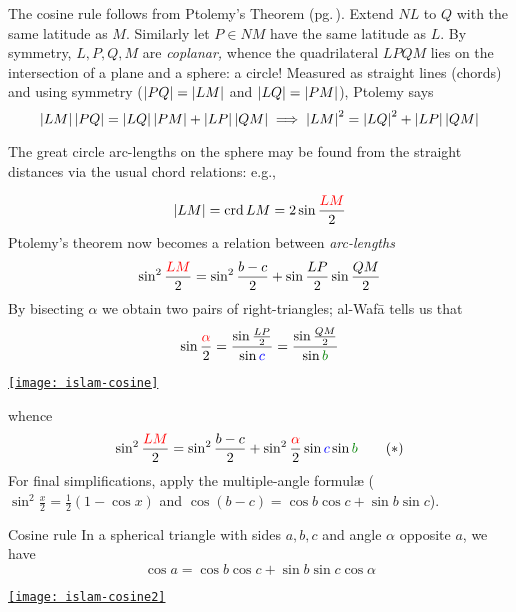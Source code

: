 The cosine rule follows from Ptolemy's Theorem (pg.\,\pageref{pg:ptolemythm}). Extend $NL$ to $Q$ with the same latitude as $M$. Similarly let $P\in NM$ have the same latitude as $L$. By symmetry, $L,P,Q,M$ are \emph{coplanar,} whence the quadrilateral $LPQM$ lies on the intersection of a plane and a sphere: a circle! Measured as straight lines (chords) and using symmetry ($\left| PQ\right|=\left| LM\right|$ and $\left| LQ\right|=\left| PM\right|$), Ptolemy says
\[
	\left| LM\right|\left| PQ\right|=\left| LQ\right|\left| PM\right|+\left| LP\right|\left| QM\right| \implies \left| LM\right|^2=\left| LQ\right|^2+\left| LP\right|\left| QM\right|
\]
\goodbreak

The great circle arc-lengths on the sphere may be found from the straight distances via the usual chord relations: e.g.,\par
\begin{minipage}[t]{0.65\linewidth}\vspace{-5pt}
	\[
		\left| LM\right|=\operatorname{crd} LM=2\sin\frac{\textcolor{red}{LM}}2
	\]
	Ptolemy's theorem now becomes a relation between \emph{arc-lengths}
	\[
		\sin^2\frac{\textcolor{red}{LM}}2=\sin^2\frac{b-c}2+\sin\frac{LP}2\sin\frac{QM}2
	\]
	By bisecting $\alpha$ we obtain two pairs of right-triangles; al-Wafā tells us that
	\[
		\sin\frac{\textcolor{red}{\alpha}}2=\frac{\sin\frac{LP}2}{\sin \textcolor{blue}{c}}=\frac{\sin\frac{QM}2}{\sin \textcolor{Green}{b}}
	\]
\end{minipage}
\hfill
\begin{minipage}[t]{0.34\linewidth}\vspace{0pt}
	\flushright
	\href{http://math.uci.edu/~ndonalds/math184/islam-cosine.html}{\texttt{[image: islam-cosine]}}
\end{minipage}
\bigbreak

\begin{minipage}[t]{0.7\linewidth}\vspace{0pt}
	whence
	\[
		\sin^2\frac{\textcolor{red}{LM}}2=\sin^2\frac{b-c}2+\sin^2\frac{\textcolor{red}{\alpha}}2\sin \textcolor{blue}{c}\sin \textcolor{Green}{b}\tag*{($\ast$)}
	\]
	For final simplifications, apply the multiple-angle formulæ ($\sin^2\frac x2=\frac 12(1-\cos x)$ and $\cos(b-c)=\cos b\cos c+\sin b\sin c$).

	\begin{cor*}{Cosine rule}{}
	In a spherical triangle with sides $a,b,c$ and angle $\alpha$ opposite $a$, we have
	\[
		\cos a=\cos b\cos c+\sin b\sin c\cos\alpha
	\]
	\end{cor*}

\end{minipage}
\hfill
\begin{minipage}[t]{0.29\linewidth}\vspace{-10pt}
	\flushright{}\label{pg:qiblacosinerule}
	\href{http://math.uci.edu/~ndonalds/math184/islam-cosine2.html}{\texttt{[image: islam-cosine2]}}
\end{minipage}
\bigbreak

